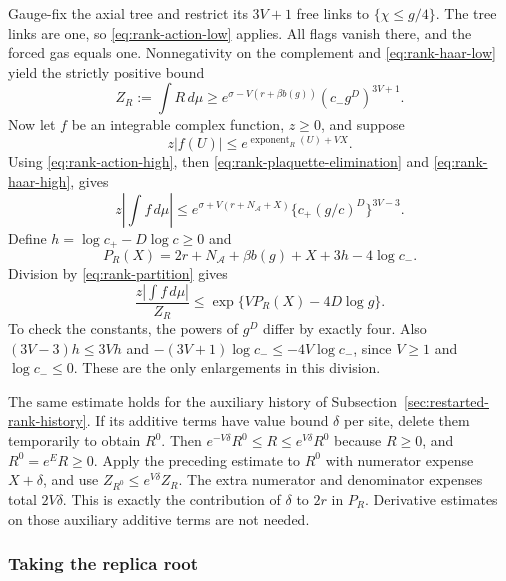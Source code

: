 Gauge-fix the axial tree and restrict its $3V+1$ free links to
$\{\chi\le g/4\}$. The tree links are one, so
\eqref{eq:rank-action-low} applies. All flags vanish there, and the
forced gas equals one. Nonnegativity on the complement and
\eqref{eq:rank-haar-low} yield the strictly positive bound
\begin{equation}\label{eq:rank-partition}
 Z_R:=\int R\,d\mu\ge
 e^{\sigma-V(r+\beta b(g))}(c_-g^D)^{3V+1}.
\end{equation}
Now let $f$ be an integrable complex function, $z\ge0$, and suppose
\[
 z|f(U)|\le e^{\operatorname{exponent}_R(U)+VX}.
\]
Using \eqref{eq:rank-action-high}, then
\eqref{eq:rank-plaquette-elimination} and
\eqref{eq:rank-haar-high}, gives
\[
 z\left|\int f\,d\mu\right|
 \le e^{\sigma+V(r+N_{\mathcal A}+X)}
             \{c_+(g/c)^D\}^{3V-3}.
\]
Define $h=\log c_+-D\log c\ge0$ and
\[
 P_R(X)=2r+N_{\mathcal A}+\beta b(g)+X+3h-4\log c_-.
\]
Division by \eqref{eq:rank-partition} gives
\begin{equation}\label{eq:rank-ratio}
 \frac{z|\int f\,d\mu|}{Z_R}
       \le \exp\{VP_R(X)-4D\log g\}.
\end{equation}
To check the constants, the powers of $g^D$ differ by exactly four.
Also $(3V-3)h\le3Vh$ and
$-(3V+1)\log c_-\le-4V\log c_-$, since $V\ge1$ and
$\log c_-\le0$. These are the only enlargements in this division.

The same estimate holds for the auxiliary history of
Subsection~\ref{sec:restarted-rank-history}. If its additive terms have
value bound $\delta$ per site, delete them temporarily to obtain $R^0$.
Then $e^{-V\delta}R^0\le R\le e^{V\delta}R^0$ because $R\ge0$,
and $R^0=e^ER\ge0$. Apply the preceding estimate to $R^0$ with
numerator expense $X+\delta$, and use
$Z_{R^0}\le e^{V\delta}Z_R$. The extra numerator and denominator
expenses total $2V\delta$. This is exactly the contribution of
$\delta$ to $2r$ in $P_R$. Derivative estimates on those auxiliary
additive terms are not needed.

\subsubsection{Taking the replica root}

